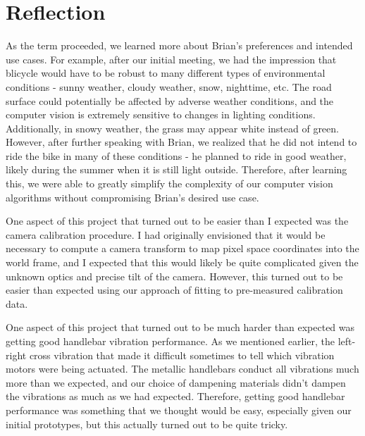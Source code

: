 \documentclass[aps,twocolumn,secnumarabic,balancelastpage,amsmath,amssymb,nofootinbib]{revtex4-1}
\begin{document}
\section{Reflection}

As the term proceeded, we learned more about Brian's preferences and intended use cases. For example, after our initial meeting, we had the impression that blicycle would have to be robust to many different types of environmental conditions - sunny weather, cloudy weather, snow, nighttime, etc. The road surface could potentially be affected by adverse weather conditions, and the computer vision is extremely sensitive to changes in lighting conditions. Additionally, in snowy weather, the grass may appear white instead of green. However, after further speaking with Brian, we realized that he did not intend to ride the bike in many of these conditions - he planned to ride in good weather, likely during the summer when it is still light outside. Therefore, after learning this, we were able to greatly simplify the complexity of our computer vision algorithms without compromising Brian's desired use case.

One aspect of this project that turned out to be easier than I expected was the camera calibration procedure. I had originally envisioned that it would be necessary to compute a camera transform to map pixel space coordinates into the world frame, and I expected that this would likely be quite complicated given the unknown optics and precise tilt of the camera. However, this turned out to be easier than expected using our approach of fitting to pre-measured calibration data.

One aspect of this project that turned out to be much harder than expected was getting good handlebar vibration performance. As we mentioned earlier, the left-right cross vibration that made it difficult sometimes to tell which vibration motors were being actuated. The metallic handlebars conduct all vibrations much more than we expected, and our choice of dampening materials didn't dampen the vibrations as much as we had expected. Therefore, getting good handlebar performance was something that we thought would be easy, especially given our initial prototypes, but this actually turned out to be quite tricky.
\end{document}
